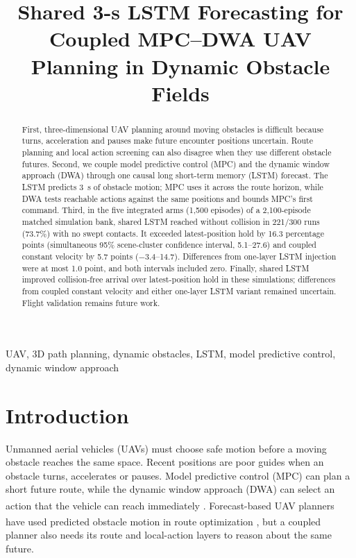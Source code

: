 \documentclass[conference,letterpaper]{IEEEtran}
\title{Shared 3-s LSTM Forecasting for Coupled MPC--DWA UAV Planning in Dynamic Obstacle Fields}
\author{\IEEEauthorblockN{Zhenhui Fu\textsuperscript{*}}
\IEEEauthorblockA{Beijing University of Chemical Technology\\
Beijing 100029, China\\
\textsuperscript{*}Corresponding author: 2025090094@buct.edu.cn}}
\let\citeplain\cite
\renewcommand{\cite}[1]{\textsuperscript{\citeplain{#1}}}
\begin{document}
\maketitle

\begin{abstract}
First, three-dimensional UAV planning around moving obstacles is difficult because turns, acceleration and pauses make future encounter positions uncertain. Route planning and local action screening can also disagree when they use different obstacle futures. Second, we couple model predictive control (MPC) and the dynamic window approach (DWA) through one causal long short-term memory (LSTM) forecast. The LSTM predicts 3~s of obstacle motion; MPC uses it across the route horizon, while DWA tests reachable actions against the same positions and bounds MPC's first command. Third, in the five integrated arms (1,500 episodes) of a 2,100-episode matched simulation bank, shared LSTM reached without collision in 221/300 runs (73.7\%) with no swept contacts. It exceeded latest-position hold by 16.3 percentage points (simultaneous 95\% scene-cluster confidence interval, 5.1--27.6) and coupled constant velocity by 5.7 points ($-3.4$--14.7). Differences from one-layer LSTM injection were at most 1.0 point, and both intervals included zero. Finally, shared LSTM improved collision-free arrival over latest-position hold in these simulations; differences from coupled constant velocity and either one-layer LSTM variant remained uncertain. Flight validation remains future work.
\end{abstract}

\begin{IEEEkeywords}
UAV, 3D path planning, dynamic obstacles, LSTM, model predictive control, dynamic window approach
\end{IEEEkeywords}

\section{Introduction}
Unmanned aerial vehicles (UAVs) must choose safe motion before a moving obstacle reaches the same space. Recent positions are poor guides when an obstacle turns, accelerates or pauses. Model predictive control (MPC) can plan a short future route, while the dynamic window approach (DWA) can select an action that the vehicle can reach immediately \cite{mayne2000,fox1997}. Forecast-based UAV planners have used predicted obstacle motion in route optimization \cite{olcay2024,xu2025}, but a coupled planner also needs its route and local-action layers to reason about the same future.
\end{document}
